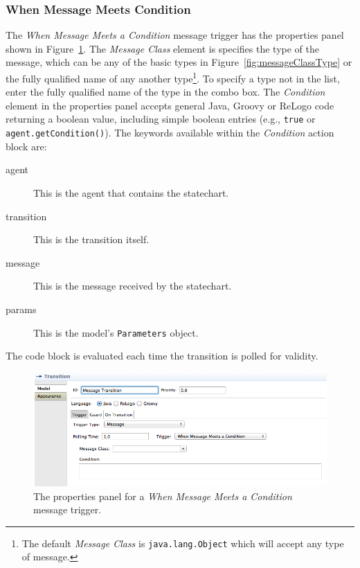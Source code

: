 \documentclass[11pt]{amsart}
\begin{document}
\subsubsection{When Message Meets Condition}
The \emph{When Message Meets a Condition} message trigger has the properties panel shown in Figure~\ref{fig:message1TransitionProperties}. The \emph{Message Class} element is specifies the type of the message, which can be any of the basic types in Figure~\ref{fig:messageClassType} or the fully qualified name of any another type\footnote{The default \emph{Message Class} is \texttt{java.lang.Object} which will accept any type of message.}. To specify a type not in the list, enter the fully qualified name of the type in the combo box. The \emph{Condition} element in the properties panel accepts general Java, Groovy or ReLogo code returning a boolean value, including simple boolean entries (e.g., \texttt{true} or \texttt{agent.getCondition()}). The keywords available within the \emph{Condition} action block are:
\begin{description}
\item[agent] This is the agent that contains the statechart.
\item[transition] This is the transition itself.
\item[message] This is the message received by the statechart.
\item[params] This is the model's \texttt{Parameters} object.
\end{description}
The code block is evaluated each time the transition is polled for validity.

\begin{figure}
\begin{center}
\vspace{.2in}
\centerline {
\includegraphics[width=5in]{StatechartsImages/Message1TransitionProperties.png}
}
\caption{The properties panel for a \emph{When Message Meets a Condition} message trigger.}
\label{fig:message1TransitionProperties}
\end{center}
\end{figure}
\end{document}
